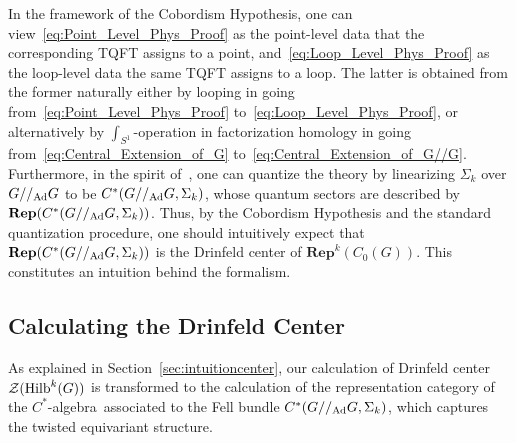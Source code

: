 \documentclass[a4paper,11pt]{article}
\newcommand{\Rep}{\textbf{Rep}}
\def\CZ{\mathcal{Z}}
\def\calg{$C^*$-algebra\ }
\def\hilb{{\rm Hilb}}
\def\gmg{G//_{\rm Ad} G}
\begin{document}
In the framework of the Cobordism Hypothesis, one can view~\eqref{eq:Point_Level_Phys_Proof} as the point-level data that the corresponding TQFT assigns to a point, and~\eqref{eq:Loop_Level_Phys_Proof} as the loop-level data the same TQFT assigns to a loop. The latter is obtained from the former naturally either by looping in going from~\eqref{eq:Point_Level_Phys_Proof} to~\eqref{eq:Loop_Level_Phys_Proof}, or alternatively by $\int_{S^1}$-operation in factorization homology in going from~\eqref{eq:Central_Extension_of_G} to~\eqref{eq:Central_Extension_of_G//G}. Furthermore, in the spirit of~\cite{Landsman:1999, Hawkins:2008, landsman2012mathematical}, one can quantize the theory by linearizing $\Sigma_k$ over $G//_{\rm Ad}G$ to be $C^*(G//_{\rm Ad}G, \Sigma_k)$, whose quantum sectors are described by $\Rep(C^*(G//_{\rm Ad}G, \Sigma_k))$. Thus, by the Cobordism Hypothesis and the standard quantization procedure, one should intuitively expect that $\Rep(C^*(G//_{\rm Ad}G, \Sigma_k))$ is the Drinfeld center of $\Rep^k(C_0(G))$. This constitutes an intuition behind the formalism. 

\subsection{Calculating the Drinfeld Center}
As explained in Section~\ref{sec:intuitioncenter}, our calculation of Drinfeld center $\CZ(\hilb^k(G))$ is transformed to the calculation of the representation category of the \calg associated to the Fell bundle $C^*(\gmg,\Sigma_k)$, which captures the twisted equivariant structure.
\end{document}
